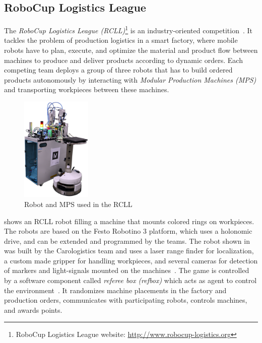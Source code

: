 \subsection{RoboCup Logistics League}

The \emph{RoboCup Logistics League (RCLL)}\footnote{RoboCup Logistics
  League website: \url{http://www.robocup-logistics.org}} is an
industry-oriented competition~\cite{LLSF-Rules-2016}. It tackles the
problem of production logistics in a smart factory, where mobile
robots have to plan, execute, and optimize the material and product
flow between machines to produce and deliver products according to
dynamic orders. Each competing team deploys a group of three robots
that has to build ordered products autonomously by interacting with
\emph{Modular Production Machines (MPS)} and transporting workpieces
between these machines.
\begin{figure}
  \centering
  \vspace{-2.7ex}
  \includegraphics[width=0.3\textwidth]{img/rcll}
  \vspace{-4ex}
  \caption[Robot and MPS used in the RCLL]{Robot and MPS used in the RCLL~\cite{chapter-cps}}
  \label{fig:rcll}
\end{figure}
 shows an RCLL robot filling a machine that mounts
colored rings on workpieces. The robots are based on the Festo
Robotino 3 platform, which uses a holonomic drive, and can be extended
and programmed by the teams. The robot shown in  was
built by the Carologistics team and uses a laser range finder for
localization, a custom made gripper for handling workpieces, and
several cameras for detection of markers and light-signals mounted on
the machines~\cite{Carologistics2015,chapter-cps}. The game is
controlled by a software component called \emph{referee box (refbox)}
which acts as agent to control the environment~\cite{RCLL-Planning}.
It randomizes machine placements in the factory and
production orders, communicates with participating robots, controls
machines, and awards points.

